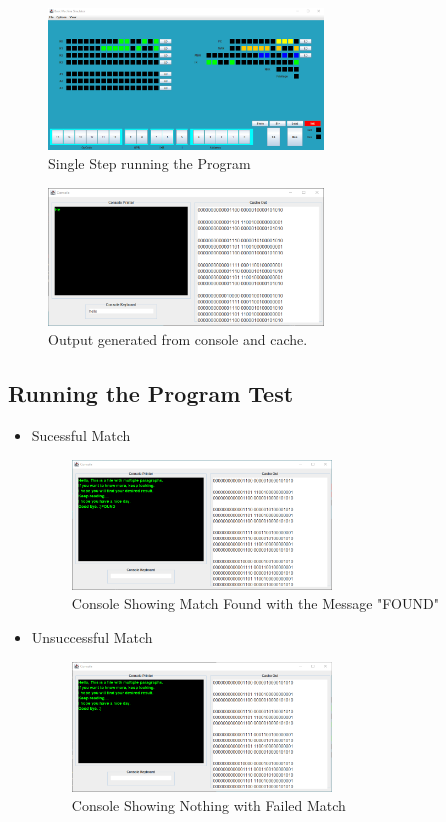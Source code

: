 \documentclass[10pt]{article}
\begin{document}
\begin{enumerate}
\begin{figure}[H]
    \centering
    \includegraphics[width=0.65\textwidth]{Pics/Fig26.png}
    \caption{Single Step running the Program}
    \label{fig:SStep}
  \end{figure}
  \begin{figure}[H]
    \centering
    \includegraphics[width=0.65\textwidth]{Pics/Fig27.png}
    \caption{Output generated from console and cache.}
    \label{fig:Console and Cache Output}
  \end{figure}
\end{enumerate}
\subsection{Running the Program Test}
\begin{itemize}
  \item Sucessful Match
  \begin{figure}[H]
    \centering
    \includegraphics[width=0.65\textwidth]{Pics/MatchFound1.png}
    \caption{Console Showing Match Found with the Message "FOUND"}
    \label{fig:MFSuccess}
  \end{figure}
  \item Unsuccessful Match
  \begin{figure}[H]
    \centering
    \includegraphics[width=0.65\textwidth]{Pics/MatchFail1.png}
    \caption{Console Showing Nothing with Failed Match}
    \label{fig:MFail}
  \end{figure}
\end{itemize}
\end{document}
